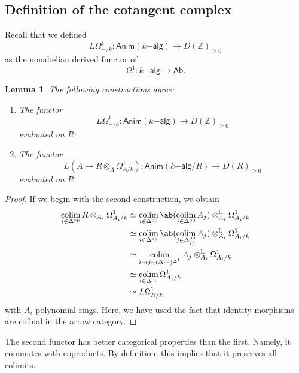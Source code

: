 \documentclass[10pt]{amsart}
\newtheorem{lem}[thm]{Lemma}
\theoremstyle{definition}
\theoremstyle{remark}
\theoremstyle{plain}
\theoremstyle{definition}
\theoremstyle{remark}
\newcommand{\Z}{\mathbb{Z}}
\renewcommand{\L}{\mathbb{L}}
\newcommand{\ms}[1]{\mathsf{#1}}
\newcommand{\1}{\mathbf{1}}
\newcommand{\2}{\mathbf{2}}
\newcommand{\3}{\mathbf{3}}
\DeclareMathOperator{\op}{op}
\DeclareMathOperator*{\colim}{colim}
\begin{document}
\subsection{Definition of the cotangent complex}%
\label{sub:Definition of the cotangent complex}

Recall that we defined
\[ L \Omega^1_{-/k} \colon \ms{Anim}(k\ms{-alg}) \to D(\Z)_{\geq 0} \] as the nonabelian derived functor of
\[ \Omega^1 \colon k\ms{-alg} \to \ms{Ab}. \]

\begin{lem}
    The following constructions agree:
    \begin{enumerate}
        \item The functor 
        \[ L \Omega^1_{-/k} \colon \ms{Anim}(k\ms{-alg}) \to D(\Z)_{\geq 0} \] evaluated on $R$;
        \item The functor 
        \[ L (A \mapsto R \otimes_A \Omega^1_{A/k}) \colon \ms{Anim}(k\ms{-alg}/R) \to D(R)_{\geq 0} \]
        evaluated on $R$.
    \end{enumerate}
\end{lem}

\begin{proof}
    If we begin with the second construction, we obtain
    \begin{align*}
        \colim_{i \in \Delta^{\op}} R \otimes_{A_i}\Omega^1_{A_i/k} &\simeq \colim_{i \in \Delta^{\op}} \ab(\colim_{j \in \Delta^{\op}} A_j) \otimes^{\L}_{A_i} \Omega^1_{A_i/k} \\
        &\simeq \colim_{i \in \Delta^{\op}} \ab(\colim_{j \in \Delta^{\op}_{i/}} A_j) \otimes_{A_i}^{\L} \Omega^1_{A_i/k} \\
        &\simeq \colim_{i \to j \in (\Delta^{\op})^{\Delta^1}} A_j \otimes_{A_i}^{\L} \Omega^1_{A_i/k} \\
        &\simeq \colim_{i \in \Delta^{\op}} \Omega^1_{A_i/k} \\
        &\simeq L \Omega^1_{R/k}.
    \end{align*}
    with $A_i$ polynomial rings. Here, we have used the fact that identity morphisms are cofinal in the arrow category.
\end{proof}

The second functor has better categorical properties than the first. Namely, it commutes with coproducts. By definition, this implies that it preserves all colimits.
\end{document}
